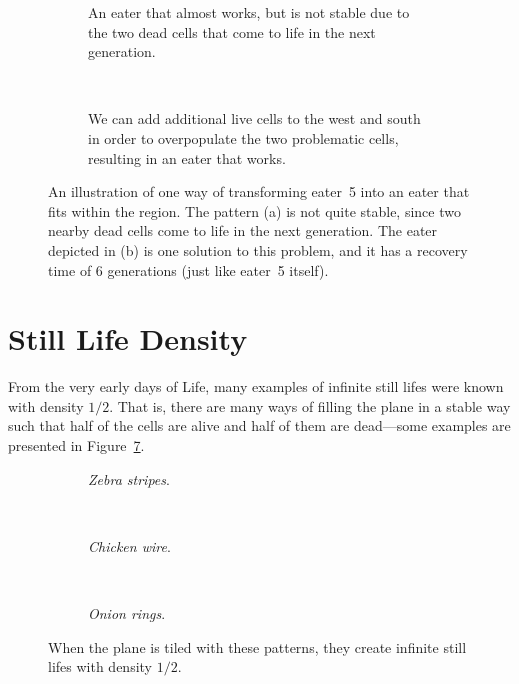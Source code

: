 \begin{figure}[!htb]
	\centering
	\begin{subfigure}{.4\textwidth}
		\centering
		\caption{An eater that almost works, but is not stable due to the two dead  cells that come to life in the next generation.}
		\label{fig:eater_constrained_eater_5_b}
	\end{subfigure} \quad \ %
	\begin{subfigure}{.54\textwidth}
		\centering
		\caption{We can add additional live cells to the west and south in order to overpopulate the two problematic cells, resulting in an eater that works.}
		\label{fig:eater_constrained_done}
	\end{subfigure}
	\caption{An illustration of one way of transforming eater~5 into an eater that fits within the  region. The pattern (a) is not quite stable, since two nearby dead cells come to life in the next generation. The eater depicted in (b) is one solution to this problem, and it has a recovery time of $6$ generations (just like eater~5 itself).}\label{fig:eater_constrained_eater_5_both_done}
\end{figure}


\section{Still Life Density}\label{sec:still_life_density}

From the very early days of Life, many examples of infinite still lifes were known with density $1/2$. That is, there are many ways of filling the plane in a stable way such that half of the cells are alive and half of them are dead---some examples are presented in Figure~\ref{fig:dense_still_lifes}.
\begin{figure}[!ht]
	\begin{subfigure}{.32\textwidth}
		\centering
		\caption{\emph{Zebra stripes}.}
		\label{fig:zebra_stripes}
	\end{subfigure} \ \ %
	\begin{subfigure}{.32\textwidth}
		\centering
		\caption{\emph{Chicken wire}.}
		\label{fig:chicken_wire}
	\end{subfigure} \ \ %
	\begin{subfigure}{.32\textwidth}
		\centering
		\caption{\emph{Onion rings}.}
		\label{fig:onion_rings}
	\end{subfigure}
	\caption{When the plane is tiled with these patterns, they create infinite still lifes with density $1/2$.}\label{fig:dense_still_lifes}
\end{figure}

